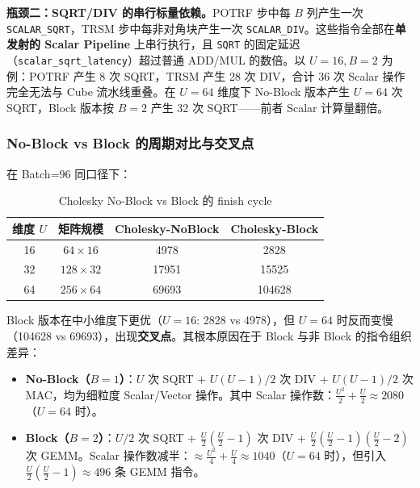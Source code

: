 \documentclass{CjC}
\begin{document}
    \textbf{瓶颈二：SQRT/DIV 的串行标量依赖。}POTRF 步中每 $B$ 列产生一次
    \texttt{SCALAR\_SQRT}，TRSM 步中每非对角块产生一次 \texttt{SCALAR\_DIV}。这些指令全部在\textbf{单发射的
    Scalar Pipeline} 上串行执行，且 \texttt{SQRT} 的固定延迟（\texttt{scalar\_sqrt\_latency}）超过普通
    ADD/MUL 的数倍。以 $U=16, B=2$ 为例：POTRF 产生 8 次 SQRT，TRSM 产生 28 次
    DIV，合计 36 次 Scalar 操作完全无法与 Cube 流水线重叠。在 $U=64$ 维度下 No-Block
    版本产生 $U=64$ 次 SQRT，Block 版本按 $B=2$ 产生 32 次 SQRT——前者 Scalar
    计算量翻倍。

    \subsubsection{No-Block vs Block 的周期对比与交叉点}

    在 Batch=96 同口径下：

    \begin{table}[H]
        \centering
        \caption{Cholesky No-Block vs Block 的 finish cycle}
        \begin{tabular}{c|ccc}
            \toprule 维度 $U$ & 矩阵规模          & Cholesky-NoBlock & Cholesky-Block \\
            \midrule 16     & $64\times16$  & 4978             & 2828           \\
            32              & $128\times32$ & 17951            & 15525          \\
            64              & $256\times64$ & 69693            & 104628         \\
            \bottomrule
        \end{tabular}
    \end{table}

    Block 版本在中小维度下更优（$U=16$: 2828 vs 4978），但 $U=64$
    时反而变慢（104628 vs 69693），出现\textbf{交叉点}。其根本原因在于 Block 与非
    Block 的指令组织差异：

    \begin{itemize}
        \item \textbf{No-Block（$B=1$）}：$U$ 次 SQRT + $U(U-1)/2$ 次 DIV +
            $U(U-1)/2$ 次 MAC，均为细粒度 Scalar/Vector 操作。其中 Scalar
            操作数：$\frac{U^{2}}{2}+\frac{U}{2}\approx 2080$（$U=64$ 时）。

        \item \textbf{Block（$B=2$）}：$U/2$ 次 SQRT +
            $\frac{U}{2}(\frac{U}{2}-1)$ 次 DIV +
            $\frac{U}{2}(\frac{U}{2}-1)(\frac{U}{2}-2)$ 次 GEMM。Scalar
            操作数减半：$\approx \frac{U^{2}}{4}+\frac{U}{4}\approx 1040$（$U=64$
            时），但引入 $\frac{U}{2}(\frac{U}{2}-1) \approx 496$ 条 GEMM 指令。
    \end{itemize}
\end{document}
